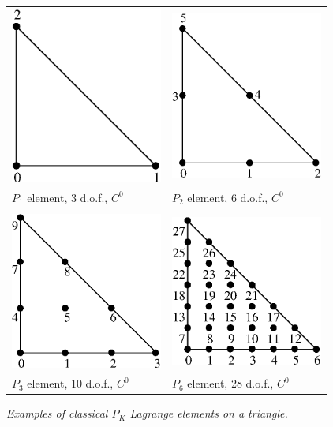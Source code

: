 \documentclass[11pt,a4paper]{article}
\begin{document}
\begin{figure}[H]
  
  \begin{center} \begin{tabular}{m{7cm}m{7cm}}
    \includegraphics[width=5cm,angle=0]{getfemlist_triangle_P1.eps} & \includegraphics[width=5cm,angle=0]{getfemlist_triangle_P2.eps} \\
    $P_1$ element, 3 d.o.f., $C^0$ & $P_2$ element, 6 d.o.f., $C^0$ \\ \\
    \includegraphics[width=5cm,angle=0]{getfemlist_triangle_P3.eps} & \includegraphics[width=5cm,angle=0]{getfemlist_triangle_P6.eps} \\
    $P_3$ element, 10 d.o.f., $C^0$ & $P_6$ element, 28 d.o.f., $C^0$
  \end{tabular} \end{center}
  \caption{ \it Examples of classical $P_K$ Lagrange elements on a triangle.} \label{fig:trianglepk}
\end{figure}
\end{document}
